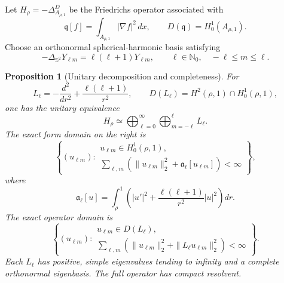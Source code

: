 \documentclass[11pt]{article}
\numberwithin{equation}{section}
\newtheorem{proposition}[theorem]{Proposition}
\theoremstyle{definition}
\theoremstyle{remark}
\begin{document}
Let \(H_\rho=-\Delta^D_{A_{\rho,1}}\) be the Friedrichs operator associated
with
\[
  \mathfrak q[f]=\int_{A_{\rho,1}}|\nabla f|^2\,dx,
  \qquad D(\mathfrak q)=H_0^1(A_{\rho,1}).
\]
Choose an orthonormal spherical-harmonic basis satisfying
\[
  -\Delta_{\mathbb S^2}Y_{\ell m}
  =\ell(\ell+1)Y_{\ell m},
  \qquad \ell\in\mathbb N_0,
  \quad -\ell\le m\le\ell.
\]

\begin{proposition}[Unitary decomposition and completeness]
\label{prop:sc-separated-spectrum}
For
\[
  L_\ell=-\frac{d^2}{dr^2}+\frac{\ell(\ell+1)}{r^2},
  \qquad
  D(L_\ell)=H^2(\rho,1)\cap H_0^1(\rho,1),
\]
one has the unitary equivalence
\begin{equation}
  H_\rho\simeq
  \bigoplus_{\ell=0}^{\infty}
  \bigoplus_{m=-\ell}^{\ell}L_\ell.
  \label{eq:sc-operator-sum}
\end{equation}
The exact form domain on the right is
\begin{equation}
  \left\{(u_{\ell m}):
  \begin{array}{l}
  u_{\ell m}\in H_0^1(\rho,1),\\
  \displaystyle
  \sum_{\ell,m}\left(\|u_{\ell m}\|_2^2
  +\mathfrak a_\ell[u_{\ell m}]\right)<\infty
  \end{array}\right\},
  \label{eq:sc-global-form-domain}
\end{equation}
where
\[
  \mathfrak a_\ell[u]
  =\int_\rho^1\left(|u'|^2
  +\frac{\ell(\ell+1)}{r^2}|u|^2\right)dr.
\]
The exact operator domain is
\begin{equation}
  \left\{(u_{\ell m}):
  \begin{array}{l}
  u_{\ell m}\in D(L_\ell),\\
  \displaystyle
  \sum_{\ell,m}\left(\|u_{\ell m}\|_2^2
  +\|L_\ell u_{\ell m}\|_2^2\right)<\infty
  \end{array}\right\}.
  \label{eq:sc-global-operator-domain}
\end{equation}
Each \(L_\ell\) has positive, simple eigenvalues tending to infinity and a
complete orthonormal eigenbasis.  The full operator has compact resolvent.
\end{proposition}
\end{document}
